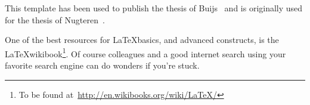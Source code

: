 This template has been used to publish the thesis of Buijs~\cite{MScBuijs2010} and is originally used for the thesis of Nugteren~\cite{MScNugteren2010}. 

One of the best resources for \LaTeX basics, and advanced constructs, is the \LaTeX wikibook\footnote{To be found at~\url{http://en.wikibooks.org/wiki/LaTeX/}}. Of course colleagues and a good internet search using your favorite search engine can do wonders if you're stuck. 